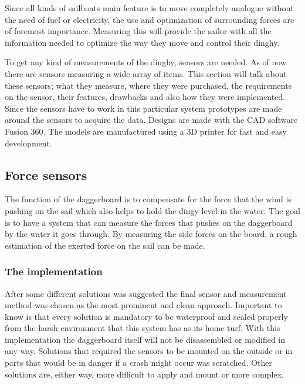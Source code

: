Since all kinds of sailboats main feature is to move completely analogue without the need of fuel or electricity, the use and optimization of surrounding forces are of foremost importance. Measuring this will provide the sailor with all the information needed to optimize the way they move and control their dinghy.

To get any kind of measurements of the dinghy, sensors are needed. As of now there are sensors measuring a wide array of items. This section will talk about these sensors; what they measure, where they were purchased, the requirements on the sensor, their features, drawbacks and also how they were implemented.
Since the sensors have to work in this particular system prototypes are made around the sensors to acquire the data.
Designs are made with the \gls{CAD} software Fusion 360\cite{cad}. The models are manufactured using a 3D printer for fast and easy development.

\subsection{Force sensors}
The function of the daggerboard is to compensate for the force that the wind is pushing on the sail which also helps to hold the dingy level in the water. The goal is to have a system that can measure the forces that pushes on the daggerboard by the water it goes through. By measuring the side forces on the board, a rough estimation of the exerted force on the sail can be made. 


\subsubsection{The implementation}
After some different solutions was suggested the final sensor and measurement method was chosen as the most prominent and clean approach. 
Important to know is that every solution is mandatory to be waterproof and sealed properly from the harsh environment that this system has as its home turf. 
With this implementation the daggerboard itself will not be disassembled or modified in any way. 
Solutions that required the sensors to be mounted on the outside or in parts that would be in danger if a crash might occur was scratched.  
Other solutions are, either way, more difficult to apply and mount or more complex.  


